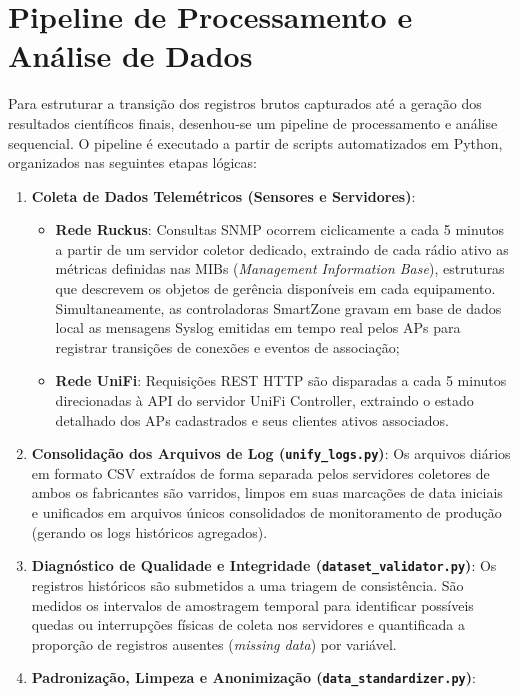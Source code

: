 \section{Pipeline de Processamento e Análise de Dados}
\label{sec:metodologia_pipeline}

Para estruturar a transição dos registros brutos capturados até a geração dos resultados científicos finais, desenhou-se um pipeline de processamento e análise sequencial. O pipeline é executado a partir de scripts automatizados em Python, organizados nas seguintes etapas lógicas:

\begin{enumerate}
    \item \textbf{Coleta de Dados Telemétricos (Sensores e Servidores)}:
    \begin{itemize}
        \item \textbf{Rede Ruckus}: Consultas SNMP ocorrem ciclicamente a cada 5 minutos a partir de um servidor coletor dedicado, extraindo de cada rádio ativo as métricas definidas nas MIBs (\textit{Management Information Base}), estruturas que descrevem os objetos de gerência disponíveis em cada equipamento. Simultaneamente, as controladoras SmartZone gravam em base de dados local as mensagens Syslog emitidas em tempo real pelos APs para registrar transições de conexões e eventos de associação;
        \item \textbf{Rede UniFi}: Requisições REST HTTP são disparadas a cada 5 minutos direcionadas à API do servidor UniFi Controller, extraindo o estado detalhado dos APs cadastrados e seus clientes ativos associados.
    \end{itemize}
    \item \textbf{Consolidação dos Arquivos de Log (\texttt{unify\_logs.py})}:
    Os arquivos diários em formato CSV extraídos de forma separada pelos servidores coletores de ambos os fabricantes são varridos, limpos em suas marcações de data iniciais e unificados em arquivos únicos consolidados de monitoramento de produção (gerando os logs históricos agregados).
    \item \textbf{Diagnóstico de Qualidade e Integridade (\texttt{dataset\_validator.py})}:
    Os registros históricos são submetidos a uma triagem de consistência. São medidos os intervalos de amostragem temporal para identificar possíveis quedas ou interrupções físicas de coleta nos servidores e quantificada a proporção de registros ausentes (\textit{missing data}) por variável.
    \item \textbf{Padronização, Limpeza e Anonimização (\texttt{data\_standardizer.py})}:

\end{enumerate}
